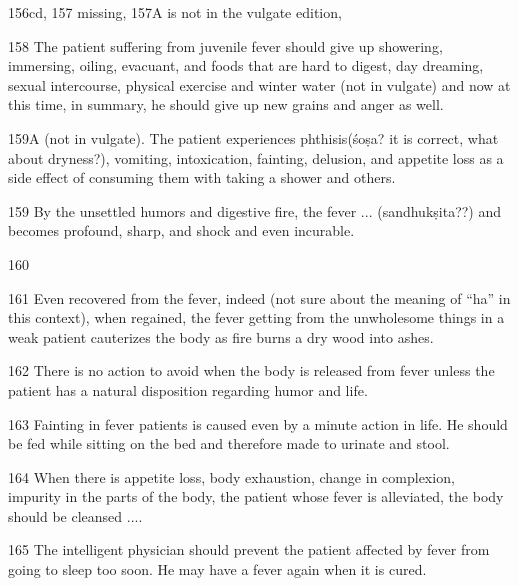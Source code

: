 \begin{translation}
    156cd, 157 missing, 157A is not in the vulgate edition, \item[158]  The 
patient
    suffering from juvenile fever should give up showering, immersing,
    oiling, evacuant, and foods that are hard to digest, day dreaming,
    sexual intercourse, physical exercise and winter water (not in vulgate)
    and now at this time, in summary, he should give up new grains and anger
    as well.
    
    159A (not in vulgate). The patient experiences phthisis(śoṣa? it is
    correct, what about dryness?), vomiting, intoxication, fainting,
    delusion, and appetite loss as a side effect of consuming them with
    taking a shower and others.
    
    
    \item[159]  By the unsettled humors and digestive fire, the fever ...
    (sandhukṣita??) and becomes profound, sharp, and shock and even
    incurable.
    
   \item[160]  
    
    \item[161]  Even recovered from the fever, indeed (not sure about the 
meaning
    of ``ha'' in this context), when regained, the fever getting from the
    unwholesome things in a weak patient cauterizes the body as fire burns a
    dry wood into ashes.
    
    \item[162]  There is no action to avoid when the body is released from fever
    unless the patient has a natural disposition regarding humor and life.
    
    
    \item[163]  Fainting in fever patients is caused even by a minute action in
    life. He should be fed while sitting on the bed and therefore made to
    urinate and stool.
    
    \item[164]  When there is appetite loss, body exhaustion, change in 
complexion,
    impurity in the parts of the body, the patient whose fever is
    alleviated, the body should be cleansed ....
    
    
    \item[165]  The intelligent physician should prevent the patient affected by
    fever from going to sleep too soon. He may have a fever again when it is
    cured.
    

\end{translation}
